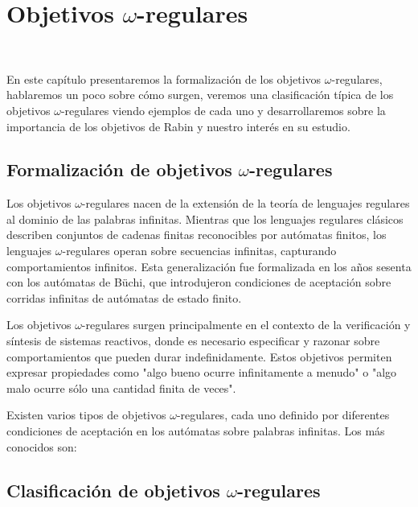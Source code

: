 \chapter{Objetivos $\omega$-regulares}
~\label{cap:objetivos}

En este capítulo presentaremos la formalización de los objetivos
$\omega$-regulares, hablaremos un poco sobre cómo surgen, veremos una
clasificación típica de los objetivos $\omega$-regulares viendo ejemplos de
cada uno y desarrollaremos sobre la importancia de los objetivos de Rabin y
nuestro interés en su estudio.

\section{Formalización de objetivos $\omega$-regulares}

Los objetivos $\omega$-regulares nacen de la extensión de la teoría de
lenguajes regulares al dominio de las palabras infinitas. Mientras que los
lenguajes regulares clásicos describen conjuntos de cadenas finitas
reconocibles por autómatas finitos, los lenguajes $\omega$-regulares operan
sobre secuencias infinitas, capturando comportamientos infinitos. Esta
generalización fue formalizada en los años sesenta con los autómatas de Büchi,
que introdujeron condiciones de aceptación sobre corridas infinitas de
autómatas de estado finito.

Los objetivos $\omega$-regulares surgen principalmente en el contexto de la
verificación y síntesis de sistemas reactivos, donde es necesario especificar y
razonar sobre comportamientos que pueden durar indefinidamente. Estos objetivos
permiten expresar propiedades como "algo bueno ocurre infinitamente a menudo" o
"algo malo ocurre sólo una cantidad finita de veces".

Existen varios tipos de objetivos $\omega$-regulares, cada uno definido por
diferentes condiciones de aceptación en los autómatas sobre palabras infinitas.
Los más conocidos son:

\section{Clasificación de objetivos $\omega$-regulares}

